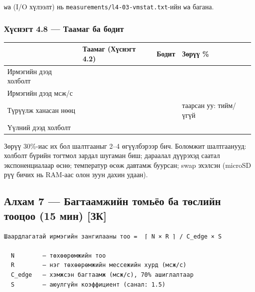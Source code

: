 \texttt{wa} (I/O хүлээлт) нь \texttt{measurements/\allowbreak{}l4-03-vmstat.\allowbreak{}txt}-ийн \texttt{wa} багана.

\hypertarget{ux445ux4afux441ux43dux44dux433ux442-4.8-ux442ux430ux430ux43cux430ux433-ux431ux430-ux431ux43eux434ux438ux442}{%
\subsubsection{Хүснэгт 4.8 --- Таамаг ба бодит}\label{ux445ux4afux441ux43dux44dux433ux442-4.8-ux442ux430ux430ux43cux430ux433-ux431ux430-ux431ux43eux434ux438ux442}}

\begingroup\scriptsize\begin{longtable}[]{@{}llll@{}}
\toprule
& Таамаг (Хүснэгт 4.2) & Бодит & Зөрүү \%\tabularnewline
\midrule
\endhead
Ирмэгийн дээд холболт & & &\tabularnewline
Ирмэгийн дээд мсж/с & & &\tabularnewline
Түрүүлж ханасан нөөц & & & таарсан уу: тийм/үгүй\tabularnewline
Үүлний дээд холболт & & &\tabularnewline
\bottomrule
\end{longtable}\endgroup

Зөрүү 30\%-иас их бол шалтгааныг 2--4 өгүүлбэрээр бич. Боломжит шалтгаанууд: холболт бүрийн тогтмол зардал шугаман биш; дараалал дүүрэхэд саатал экспоненциалаар өснө; температур өсөж давтамж буурсан; swap эхэлсэн (microSD рүү бичих нь RAM-аас олон зуун дахин удаан).

\hypertarget{ux430ux43bux445ux430ux43c-7-ux431ux430ux433ux442ux430ux430ux43cux436ux438ux439ux43d-ux442ux43eux43cux44cux451ux43e-ux431ux430-ux442ux4e9ux441ux43bux438ux439ux43d-ux442ux43eux43eux446ux43eux43e-15-ux43cux438ux43d-ux437ux43a}{%
\subsection{Алхам 7 --- Багтаамжийн томьёо ба төслийн тооцоо (15 мин) {[}ЗК{]}}\label{ux430ux43bux445ux430ux43c-7-ux431ux430ux433ux442ux430ux430ux43cux436ux438ux439ux43d-ux442ux43eux43cux44cux451ux43e-ux431ux430-ux442ux4e9ux441ux43bux438ux439ux43d-ux442ux43eux43eux446ux43eux43e-15-ux43cux438ux43d-ux437ux43a}}

\begin{verbatim}
Шаардлагатай ирмэгийн зангилааны тоо =  ⌈ N × R ⌉ / C_edge × S

  N        — төхөөрөмжийн тоо
  R        — нэг төхөөрөмжийн мессежийн хурд (мсж/с)
  C_edge   — хэмжсэн багтаамж (мсж/с), 70% ашиглалтаар
  S        — аюулгүйн коэффициент (санал: 1.5)
\end{verbatim}

